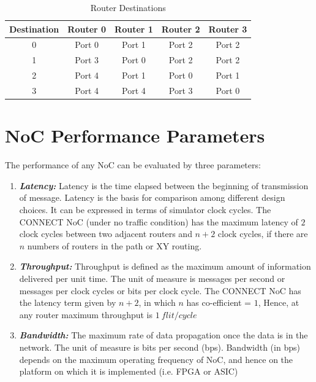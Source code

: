 \begin{table} [H]
\caption{Router Destinations}
\begin{center}
\begin{tabular}{||c | c | c | c | c||} 
\hline
	Destination &   Router 0 &   Router 1 &   Router 2 &   Router 3 \\ \hline
	    0 	    &   Port 0   &   Port 1   &   Port 2   &   Port 2   \\
	    1 	    &   Port 3   &   Port 0   &   Port 2   &   Port 2   \\
	    2 	    &   Port 4   &   Port 1   &   Port 0   &   Port 1   \\
	    3 	    &   Port 4 	 &   Port 4   &   Port 3   &   Port 0   \\ \hline
\end{tabular}
\end{center}
\label{Router_Destinations}
\end{table}

\section {NoC Performance Parameters}
The performance of any NoC can be evaluated by three parameters:
\begin{enumerate}
 \item \textbf{\textit{Latency:}} Latency is the time elapsed between  the beginning of transmission of message. Latency is the basis for comparison among different design choices. It can be expressed in terms of simulator clock cycles. The CONNECT \cite{connect_NoC} NoC (under no traffic condition) has the maximum latency of $2$ clock cycles between two adjacent routers and $n+2$ clock cycles, if there are $n$ numbers of routers in the path or XY routing.
 \item \textbf{\textit{Throughput:}} Throughput is defined as the maximum amount of information delivered per unit time. The unit of measure is messages per second or messages per clock cycles or bits per clock cycle. The CONNECT \cite{connect_NoC} NoC has the latency term given by $n+2$, in which $n$ has co-efficient = $1$, Hence, at any router maximum throughput is $1\ flit/cycle$ 
 \item \textbf{\textit{Bandwidth:}} The maximum rate of data propagation once the data is in the network. The unit of measure is bits per second (bps). Bandwidth (in bps) depends on the maximum operating frequency of NoC, and hence on the platform on which it is implemented (i.e. FPGA or ASIC) 
\end{enumerate}
\newpage
